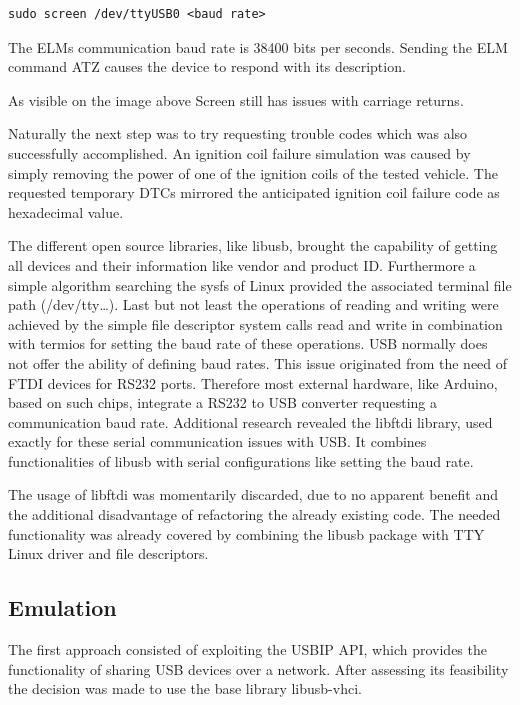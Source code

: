 \begin{verbatim}
sudo screen /dev/ttyUSB0 <baud rate> 
\end{verbatim}

The ELMs communication baud rate is 38400 bits per seconds. Sending the ELM command ATZ causes the device to respond with its description.


As visible on the image above Screen still has issues with carriage returns.

Naturally the next step was to try requesting trouble codes which was also successfully accomplished. An ignition coil failure simulation was 
caused by simply removing the power of one of the ignition coils of the tested vehicle. The requested temporary DTCs mirrored the anticipated 
ignition coil failure code as hexadecimal value. 


The different open source libraries, like libusb, brought the capability of getting all devices and their information like vendor and product ID.
Furthermore a simple algorithm searching the sysfs of Linux provided the associated terminal file path (/dev/tty…). Last but not least the 
operations of reading and writing were achieved by the simple file descriptor system calls read and write in combination with termios for 
setting the baud rate of these operations. USB normally does not offer the ability of defining baud rates. This issue originated from the need 
of FTDI devices for RS232 ports. Therefore most external hardware, like Arduino, based on such chips, integrate a RS232 to USB converter 
requesting a communication baud rate. Additional research revealed the libftdi library, used exactly for these serial communication issues with 
USB. It combines functionalities of libusb with serial configurations like setting the baud rate. 

The usage of libftdi was momentarily discarded, due to no apparent benefit and the  additional disadvantage of refactoring the already existing 
code. The needed functionality was already covered by combining the libusb package with TTY Linux driver and file descriptors.

\subsection{Emulation}
\label{sec:emulation}
The first approach consisted of exploiting the USBIP API, which provides the functionality of sharing USB devices over a network. After 
assessing its feasibility the decision was made to use the base library libusb-vhci.

